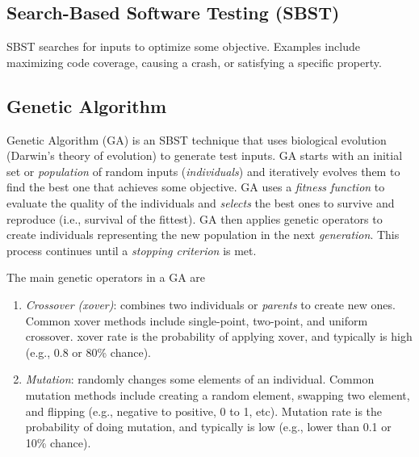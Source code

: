 \documentclass[oneside,11pt,dvipsnames]{book}
\begin{document}
\subsection{Search-Based Software Testing (SBST)}
SBST searches for inputs to optimize some objective. Examples include maximizing code coverage, causing a crash, or satisfying a specific property.
\subsection{Genetic Algorithm}\label{sec:ga}

Genetic Algorithm (GA) is an SBST technique that uses biological evolution (Darwin's theory of evolution) to generate test inputs.
GA starts with an initial set or \emph{population} of random inputs (\emph{individuals}) and iteratively evolves them to find the best one that achieves some objective. GA uses a \emph{fitness function} to evaluate the quality of the individuals and \emph{selects} the best ones to survive and reproduce (i.e., survival of the fittest). GA then applies genetic operators to create individuals representing the new population in the next \emph{generation}. This process continues until a \emph{stopping criterion} is met.

The main genetic operators in a GA are
\begin{enumerate}
    \item \emph{Crossover (xover)}: combines two individuals or \emph{parents} to create new ones. Common xover methods include single-point, two-point, and uniform crossover. xover rate is the probability of applying xover, and typically is high (e.g., 0.8 or 80\% chance).
    \item \emph{Mutation}: randomly changes some elements of an individual. Common mutation methods include creating a random element, swapping two element, and flipping (e.g., negative to positive, 0 to 1, etc). Mutation rate is the probability of doing mutation, and typically is low (e.g., lower than 0.1 or 10\% chance).
\end{enumerate}
\end{document}
